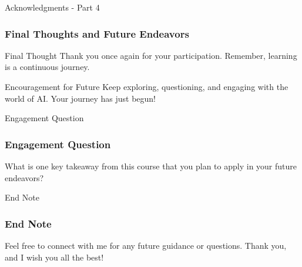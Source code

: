 \documentclass[aspectratio=169]{beamer}
\begin{document}
\begin{frame}[fragile]{Acknowledgments - Part 4}
    \frametitle{Final Thoughts and Future Endeavors}
    \begin{block}{Final Thought}
        Thank you once again for your participation. Remember, learning is a continuous journey.
    \end{block}
    \begin{block}{Encouragement for Future}
        Keep exploring, questioning, and engaging with the world of AI. Your journey has just begun!
    \end{block}
\end{frame}

\begin{frame}[fragile]{Engagement Question}
    \frametitle{Engagement Question}
    What is one key takeaway from this course that you plan to apply in your future endeavors?
\end{frame}

\begin{frame}[fragile]{End Note}
    \frametitle{End Note}
    Feel free to connect with me for any future guidance or questions. Thank you, and I wish you all the best!
\end{frame}
\end{document}
